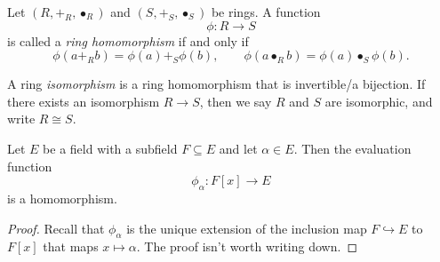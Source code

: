 \begin{definition}\label{dfn:1.11}
	Let $(R,+_R,\bullet_R)$ and $(S,+_S,\bullet _S)$ be rings. A function
	\[
		\phi : R \to S
\]
	is called a \emph{ring homomorphism} if and only if
	\[
		\phi (a+_Rb)=\phi (a)+_S\phi (b),\qquad \phi (a\bullet _Rb)=\phi (a)\bullet _S\phi (b)
	.\]
\end{definition}
\begin{definition}[Isomorphism]\label{dfn:1.12}
	A ring \emph{isomorphism} is a ring homomorphism that is invertible/a bijection. If there exists an isomorphism $R\to S$, then we say $R$ and $S$ are isomorphic, and write $R\cong S$.
\end{definition}
\begin{theorem}\label{thm:1.2}
	Let $E$ be a field with a subfield $F\subseteq E$ and let $\alpha \in E$. Then the evaluation function
	\[
		\phi_\alpha : F[x] \to E
	\]
	is a homomorphism.
\end{theorem}
\begin{proof}
	Recall that $\phi_\alpha $ is the unique extension of the inclusion map $F\hookrightarrow E$ to $F[x]$ that maps $x\mapsto  \alpha $. The proof isn't worth writing down.
\end{proof}

